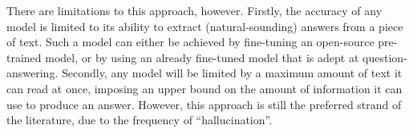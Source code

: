 There are limitations to this approach, however. Firstly, the accuracy of any model is limited to its ability to extract (natural-sounding) answers from a piece of text. Such a model can either be achieved by fine-tuning an open-source pre-trained model, or by using an already fine-tuned model that is adept at question-answering. Secondly, any model will be limited by a maximum amount of text it can read at once, imposing an upper bound on the amount of information it can use to produce an answer. However, this approach is still the preferred strand of the literature, due to the frequency of ``hallucination''.








